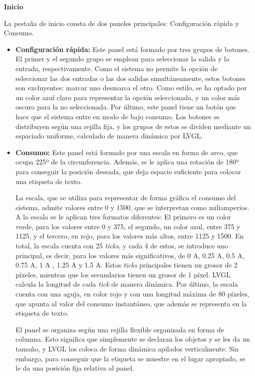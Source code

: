 \textbf{Inicio}

La pestaña de inicio consta de dos paneles principales: Configuración rápida y Consumo.
\begin{itemize}
    \item \textbf{Configuración rápida:} Este panel está formado por tres grupos de botones. El primer y el segundo grupo se emplean para seleccionar la salida y la entrada, respectivamente. Como el sistema no permite la opción de seleccionar las dos entradas o las dos salidas simultáneamente, estos botones son excluyentes: marcar uno desmarca el otro. Como estilo, se ha optado por un color azul claro para representar la opción seleccionada, y un color más oscuro para la no seleccionada. Por último, este panel tiene un botón que hace que el sistema entre en modo de bajo consumo. Los botones se distribuyen según una rejilla fija, y los grupos de estos se dividen mediante un espaciado uniforme, calculado de manera dinámica por LVGL.
    \item \textbf{Consumo:} Este panel está formado por una escala en forma de arco, que ocupa 225º de la circunferencia. Además, se le aplica una rotación de 180º para conseguir la posición deseada, que deja espacio suficiente para colocar una etiqueta de texto. 
    
    La escala, que se utiliza para representar de forma gráfica el consumo del sistema, admite valores entre 0 y 1500, que se interpretan como miliamperios. A la escala se le aplican tres formatos diferentes: El primero es un color verde, para los valores entre 0 y 375, el segundo, un color azul, entre 375 y 1125, y el tercero, en rojo, para los valores más altos, entre 1125 y 1500. En total, la escala cuenta con 25 \textit{ticks}, y cada 4 de estos, se introduce uno principal, es decir, para los valores más significativos, de 0 A, 0.25 A, 0.5 A, 0.75 A, 1 A , 1.25 A y 1.5 A. Estos \textit{ticks} principales tienen un grosor de 2 píxeles, mientras que los secundarios tienen un grosor de 1 píxel. LVGL calcula la longitud de cada \textit{tick} de manera dinámica. Por último, la escala cuenta con una aguja, en color rojo y con una longitud máxima de 80 píxeles, que apunta al valor del consumo instantáneo, que además se representa en la etiqueta de texto.

    El panel se organiza según una rejilla flexible organizada en forma de columna. Esto significa que simplemente se declaran los objetos y se les da un tamaño, y LVGL los coloca de forma dinámica apilados verticalmente. Sin embargo, para conseguir que la etiqueta se muestre en el lugar apropiado, se le da una posición fija relativa al panel.
\end{itemize}

